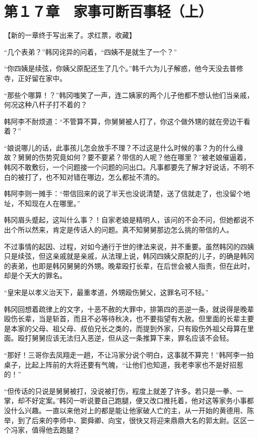 \section{第１７章　家事可断百事轻（上）}

【新的一章终于写出来了。求红票，收藏】

“几个表弟？”韩冈诧异的问着，“四姨不是就生了一个？”

“你四姨是续弦，你姨父原配还生了几个。”韩千六为儿子解惑，他今天没去普修寺，正好留在家中。

“那些个哪算！？”韩冈嗤笑了一声，连二姨家的两个儿子他都不想认他们当亲戚，何况这种八杆子打不着的？

韩阿李不耐烦道：“不管算不算，你舅舅被人打了，你这个做外甥的就在旁边干看着？”

“娘说哪儿的话，此事孩儿怎会放手不理？不过这是什么时候的事？为的什么缘故？舅舅的伤势究竟如何？要不要紧？带信的人呢？他在哪里？”被老娘催逼着，韩冈不敢敷衍，一个问题接一个问题的问出口。凡事都要先了解才好说话，不明不白的被打了，也不知对错在哪边，怎么都扯不清的。

韩阿李则一摊手：“带信回来的说了半天也没说清楚，送了信就走了，也没留个地址，不知现在人在哪里。”

韩冈眉头蹙起，这叫什么事？！自家老娘是精明人，该问的不会不问，但她都说不出个所以然来，肯定是传话人的问题。真不知舅舅那边怎么挑的带信的人。

不过事情的起因、过程，对如今通行于世的律法来说，并不重要。虽然韩冈的四姨只是续弦，但这亲戚就是亲戚，从法理上说，韩冈四姨父原配的儿子，的确是韩冈的表弟，也即是韩冈舅舅的外甥。晚辈殴打长辈，在后世会被人指责，但在此时，却是个天大的罪名。

“皇宋是以孝义治天下，最重孝道，外甥殴伤舅父，这罪名可不轻。”

韩冈回想着疏律上的文字，十恶不赦的大罪中，排第四的恶逆一条，就说得是晚辈殴伤长辈，当是斩首，而且不必等待秋决，也不要指望有大赦。但里面的长辈主要是本家的父母、祖父母、叔伯兄长之类的，而提到外家，只有殴伤外祖父母算在里面。殴打舅舅应该无法归入恶逆，但从这一条推算下来，罪名应该不会轻。

“那好！三哥你去凤翔走一趟，不让冯家分说个明白，这事就不算完！”韩阿李一拍桌子，比起上阵前的大将还要有气魄，“让他们也知道，我老李家也不是好招惹的！”

“但传话的只说是舅舅被打，没说被打伤，程度上就差了许多。若只是一拳、一掌，却不好定案。”韩冈一听说要自己跑腿，便又改口推托着，他对这等家务小事都没什么兴趣。一直以来他对上的都是能让他家破人亡的主，从一开始的黄德用、陈举，到了后来的李师中、窦舜卿、向宝，很快又将迎来鼎鼎大名的郭太尉。区区一个冯家，值得他去跑腿？

